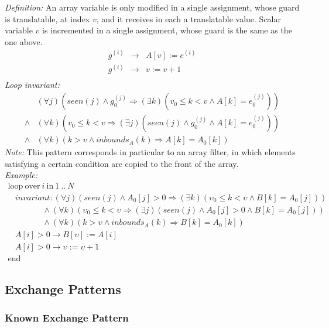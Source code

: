 \documentclass[a4paper,10pt]{article}
\newcommand{\idx}{\ensuremath{i}\xspace}
\newcommand{\at}[1]{{(#1)}}
\newcommand{\KWloop}{\ensuremath{\mathrm{loop}~}}
\newcommand{\KWend}{\ensuremath{\mathrm{end}~}}
\newcommand{\KWover}{\ensuremath{\mathrm{over}~}}
\newcommand{\KWin}{\ensuremath{~\mathrm{in}~}}
\newcommand{\impl}{\ensuremath{\Longrightarrow}}
\newcommand{\inbounds}[2]{\ensuremath{\mathit{inbounds}_{#1}(#2)}\xspace}
\newcommand{\seen}[1]{\ensuremath{\mathit{seen}(#1)}\xspace}
\newcommand{\loopinvariant}{\noindent\textit{Loop invariant:}\xspace}
\newcommand{\patterndef}{\noindent\textit{Definition:}\xspace}
\newcommand{\patternexample}{\noindent\textit{Example:}\xspace}
\newcommand{\patternnote}{\noindent\textit{Note:}\xspace}
\begin{document}
\patterndef An array variable is only modified in a single assignment, whose
guard is translatable, at index $v$, and it receives in each a translatable
value. Scalar variable $v$ is incremented in a single assignment, whose guard
is the same as the one above.
%
\begin{eqnarray*}
g^\at{\idx} &\rightarrow& A[v] := e^\at{\idx}\\
g^\at{\idx} &\rightarrow& v := v + 1\\
\end{eqnarray*}
%
\loopinvariant
%
\begin{eqnarray*}
&(\forall j)(\seen{j} \land g_0^\at{j} \impl (\exists k)(v_0 \leq k < v \land A[k] = e_0^\at{j}))  \\
\land&
(\forall k)(v_0 \leq k < v \impl (\exists j)(\seen{j} \land g_0^\at{j} \land A[k] = e_0^\at{j}))  \\
\land&
(\forall k)(k > v \land \inbounds{A}{k} \impl A[k] = A_0[k])
\end{eqnarray*}
%
\patternnote This pattern corresponds in particular to an array filter, in
which elements satisfying a certain condition are copied to the front of the
array.\\
%
\patternexample
$$\begin{array}{l}
  \KWloop \KWover i \KWin 1~..~N \\
  ~~~~ \textit{invariant}: (\forall j)(\seen{j} \land A_0[j] > 0 \impl (\exists k)(\upsilon_0 \leq k < \upsilon \land B[k] = A_0[j]))\\
  ~~~~~~~~~~~~~~~~~~~ \land (\forall k)(\upsilon_0 \leq k < \upsilon \impl (\exists j)(\seen{j} \land  A_0[j] > 0 \land B[k] = A_0[j]))\\
  ~~~~~~~~~~~~~~~~~~~ \land (\forall k)(k > \upsilon \land \inbounds{A}{k} \impl B[k] = A_0[k])\\
  ~~~~ A[i] > 0 \rightarrow B[\upsilon] := A[i]\\
  ~~~~ A[i] > 0 \rightarrow \upsilon := \upsilon + 1\\
  \KWend
\end{array}$$

\subsection{Exchange Patterns}

\subsubsection*{Known Exchange Pattern}
\end{document}
